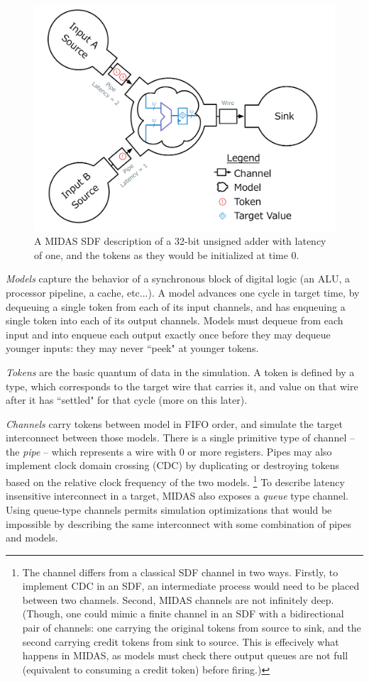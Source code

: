 \begin{figure}
	\centering
	\includegraphics[width=16cm]{figures/adder-example.pdf}
    \caption{A MIDAS SDF description of a 32-bit unsigned adder with latency of
    one, and the tokens as they would be initialized at time 0.}
	\label{fig:adder-example}
\end{figure}

\emph{Models} capture the behavior of a synchronous block of digital logic (an
ALU, a processor pipeline, a cache, etc...). A model advances one cycle in
target time, by dequeuing a single token from each of its input channels, and
has enqueuing a single token into each of its output channels.  Models must
dequeue from each input and into enqueue each output exactly once before they
may dequeue younger inputs: they may never ``peek" at younger tokens.

\emph{Tokens} are the basic quantum of data in the simulation. A token is
defined by a type, which corresponds to the target wire that carries it, and
value on that wire after it has ``settled" for that cycle (more on this later).

\emph{Channels} carry tokens between model in FIFO order, and simulate the
target interconnect between those models. There is a single primitive type of
channel --  the \emph{pipe} -- which represents a wire with 0 or more
registers. Pipes may also implement clock domain crossing (CDC) by duplicating
or destroying tokens based on the relative clock frequency of the two models.
\footnote{The channel differs from a classical SDF channel in two ways.
Firstly, to implement CDC in an SDF, an intermediate process would need to be
placed between two channels. Second, MIDAS channels are not infinitely deep.
(Though, one could mimic a finite channel in an SDF with a bidirectional pair
of channels: one carrying the original tokens from source to sink, and the
second carrying credit tokens from sink to source. This is effecively what
happens in MIDAS, as models must check there output queues are not full
(equivalent to consuming a credit token) before firing.)} To describe latency
insensitive interconnect in a target, MIDAS also exposes a \emph{queue} type
channel. Using queue-type channels permits simulation optimizations that would
be impossible by describing the same interconnect with some combination of
pipes and models.


